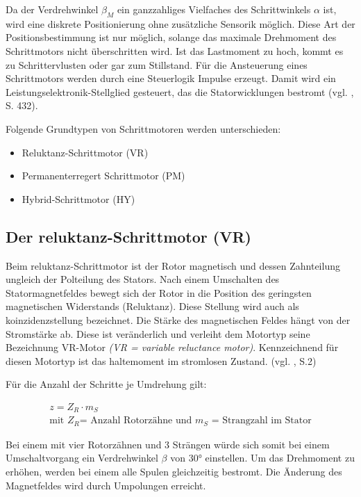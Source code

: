 Da der Verdrehwinkel $\beta_M$ ein ganzzahliges Vielfaches des Schrittwinkels $\alpha$ ist, wird eine diskrete Positionierung ohne zusätzliche Sensorik möglich. Diese Art der Positionsbestimmung ist nur möglich, solange das maximale Drehmoment des Schrittmotors nicht überschritten wird. Ist das Lastmoment zu hoch, kommt es zu Schrittervlusten oder gar zum Stillstand.   Für die Ansteuerung eines Schrittmotors werden durch eine Steuerlogik Impulse erzeugt. Damit wird ein Leistungselektronik-Stellglied gesteuert, das die Statorwicklungen bestromt (vgl. \cite{kleinantriebe}, S. 432). \newline

Folgende Grundtypen von Schrittmotoren werden unterschieden: 
\begin{itemize}
	\item Reluktanz-Schrittmotor (VR)
	\item Permanenterregert Schrittmotor (PM)
	\item Hybrid-Schrittmotor (HY)
\end{itemize}

\newpage

\subsection{Der \acrshort{reluktanz}-Schrittmotor (VR)}

Beim \acrshort{reluktanz}-Schrittmotor ist der Rotor magnetisch und dessen Zahnteilung ungleich der Polteilung des Stators. Nach einem Umschalten des Statormagnetfeldes bewegt sich der Rotor in die Position des geringsten magnetischen Widerstands (Reluktanz). Diese Stellung wird auch als \acrshort{koinzidenzstellung} bezeichnet. Die Stärke des magnetischen Feldes hängt von der Stromstärke ab. Diese ist veränderlich und verleiht dem Motortyp seine Bezeichnung VR-Motor \textit{(VR = variable reluctance motor)}. Kennzeichnend für diesen Motortyp ist das \acrshort{haltemoment} im stromlosen Zustand. (vgl. \cite{schrittmotorBa}, S.2)

Für die Anzahl der Schritte je Umdrehung gilt: 

\begin{align}
	z = Z_R\cdot m_S  \\
	\text{mit } Z_R \text{= Anzahl Rotorzähne und } m_S \text{ = Strangzahl im Stator}
\end{align}

Bei einem mit vier Rotorzähnen und 3 Strängen würde sich somit bei einem Umschaltvorgang ein Verdrehwinkel $\beta$ von 30° einstellen. Um das Drehmoment zu erhöhen, werden bei einem alle Spulen gleichzeitig bestromt. Die Änderung des Magnetfeldes wird durch Umpolungen erreicht. 

